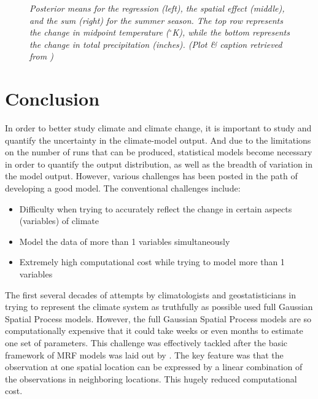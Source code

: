 \documentclass{article}
\begin{document}
\begin{figure}
  \centering
  \caption{\small \emph{Posterior means for the regression (left), the spatial effect (middle), and the sum (right) for the summer season. The top row represents the change in midpoint temperature ($^\circ$K), while the bottom represents the change in total precipitation (inches). (Plot \& caption retrieved from \cite{paper})}}
  \label{fig: Fig10}
\end{figure}

\section{Conclusion}
In order to better study climate and climate change, it is important to study and quantify the uncertainty in the climate-model output. And due to the limitations on the number of runs that can be produced, statistical models become necessary in order to quantify the output distribution, as well as the breadth of variation in the model output. However, various challenges has been posted in the path of developing a good model. The conventional challenges include:
\begin{itemize}
    \item Difficulty when trying to accurately reflect the change in certain aspects (variables) of climate
    \item Model the data of more than 1 variables simultaneously
    \item Extremely high computational cost while trying to model more than 1 variables
\end{itemize}

 The first several decades of attempts by climatologists and geostatisticians in trying to represent the climate system as truthfully as possible used full Gaussian Spatial Process models. However, the full Gaussian Spatial Process models are so computationally expensive that it could take weeks or even months to estimate one set of parameters. This challenge was effectively tackled after the basic framework of MRF models was laid out by \cite{besag}. The key feature was that the observation at one spatial location can be expressed by a linear combination of the observations in neighboring locations. This hugely reduced computational cost.
\end{document}
